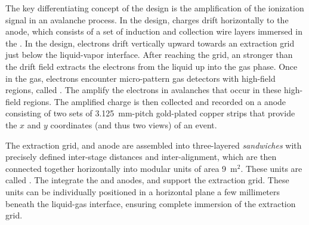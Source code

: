 The key differentiating concept of the \dual design is the amplification of the ionization signal in an avalanche process. In the \single design, charges drift horizontally to the anode, which consists of a set of induction and collection wire layers immersed in the \lar. In the \dual design, electrons drift vertically upward towards an extraction grid just below the liquid-vapor interface. After reaching the grid, an \efield stronger than the drift field extracts the electrons from the liquid up into the gas phase. Once in the gas, electrons encounter micro-pattern gas detectors with high-field regions, called . The  amplify the electrons in avalanches that occur in these high-field regions. %
The amplified charge is then collected and recorded on a \twod anode
consisting of two sets of \SI{3.125}{mm}-pitch gold-plated copper strips that provide the $x$
and $y$ coordinates (and thus two views) of an event.



The extraction grid,  and anode are assembled into three-layered \textit{sandwiches} 
with precisely defined inter-stage distances and inter-alignment,  which are then connected together horizontally into
modular units of area \num{9}~m$^2$. These units are called .
The  integrate the  and anodes, and support the extraction grid. These units can be individually positioned in a horizontal plane a few millimeters beneath the liquid-gas interface, ensuring complete immersion of the extraction grid. 

